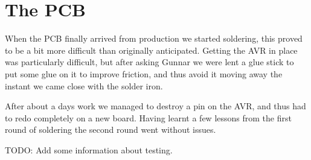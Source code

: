 \section {The PCB}

When the PCB finally arrived from production we started soldering, this proved to be a bit
more difficult than originally anticipated. Getting the AVR in place was particularly difficult,
but after asking Gunnar we were lent a glue stick to put some glue on it to improve friction, and
thus avoid it moving away the instant we came close with the solder iron.

After about a days work we managed to destroy a pin on the AVR, and thus had to redo completely on
a new board. Having learnt a few lessons from the first round of soldering the second round went without
issues.

TODO: Add some information about testing.

